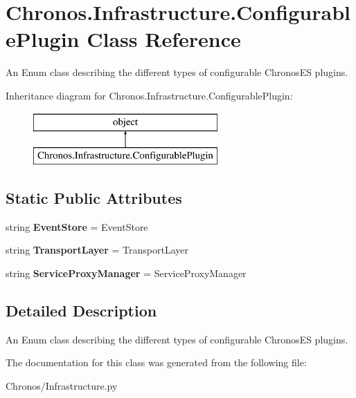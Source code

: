 \hypertarget{classChronos_1_1Infrastructure_1_1ConfigurablePlugin}{}\section{Chronos.\+Infrastructure.\+Configurable\+Plugin Class Reference}
\label{classChronos_1_1Infrastructure_1_1ConfigurablePlugin}


An Enum class describing the different types of configurable Chronos\+ES plugins.  


Inheritance diagram for Chronos.\+Infrastructure.\+Configurable\+Plugin\+:\begin{figure}[H]
\begin{center}
\leavevmode
\includegraphics[height=2.000000cm]{classChronos_1_1Infrastructure_1_1ConfigurablePlugin}
\end{center}
\end{figure}
\subsection*{Static Public Attributes}
\begin{DoxyCompactItemize}
\item 
string {\bfseries Event\+Store} = \textquotesingle{}Event\+Store\textquotesingle{}
\item 
string {\bfseries Transport\+Layer} = \textquotesingle{}Transport\+Layer\textquotesingle{}
\item 
string {\bfseries Service\+Proxy\+Manager} = \textquotesingle{}Service\+Proxy\+Manager\textquotesingle{}
\end{DoxyCompactItemize}


\subsection{Detailed Description}
An Enum class describing the different types of configurable Chronos\+ES plugins. 

The documentation for this class was generated from the following file\+:\begin{DoxyCompactItemize}
\item 
Chronos/Infrastructure.\+py\end{DoxyCompactItemize}
